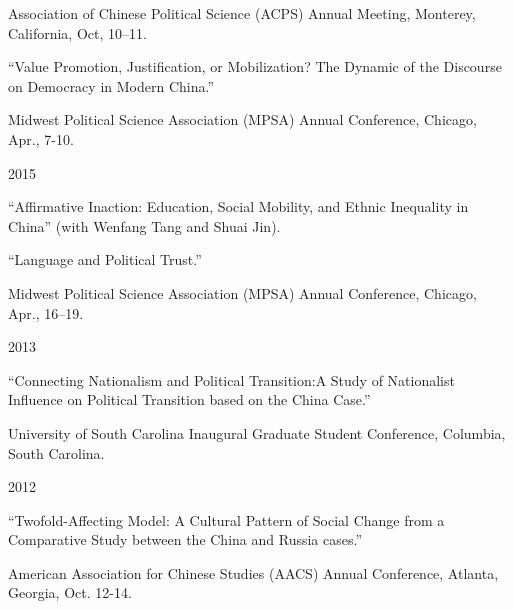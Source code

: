 \documentclass[10.5pt,]{article}
\providecommand{\tightlist}{%
  \setlength{\itemsep}{0pt}\setlength{\parskip}{0pt}}
\renewenvironment{itemize}{
  \begin{list}{}{
    \setlength{\leftmargin}{1.5em}
  }
}{
  \end{list}
}
\begin{document}
\begin{itemize}
\begin{itemize}
    \begin{itemize}
    \tightlist
    \item
      \footnotesize Association of Chinese Political Science (ACPS)
      Annual Meeting, Monterey, California, Oct, 10--11.
    \end{itemize}
  \item
    ``Value Promotion, Justification, or Mobilization? The Dynamic of
    the Discourse on Democracy in Modern China.''

    \begin{itemize}
    \tightlist
    \item
      \footnotesize Midwest Political Science Association (MPSA) Annual
      Conference, Chicago, Apr., 7-10.
    \end{itemize}
  \end{itemize}
\item
  2015

  \begin{itemize}
  \tightlist
  \item
    ``Affirmative Inaction: Education, Social Mobility, and Ethnic
    Inequality in China'' (with Wenfang Tang and Shuai Jin).
  \item
    ``Language and Political Trust.''

    \begin{itemize}
    \tightlist
    \item
      \footnotesize Midwest Political Science Association (MPSA) Annual
      Conference, Chicago, Apr., 16--19.
    \end{itemize}
  \end{itemize}
\item
  2013

  \begin{itemize}
  \tightlist
  \item
    ``Connecting Nationalism and Political Transition:A Study of
    Nationalist Influence on Political Transition based on the China
    Case.''

    \begin{itemize}
    \tightlist
    \item
      \footnotesize University of South Carolina Inaugural Graduate
      Student Conference, Columbia, South Carolina.
    \end{itemize}
  \end{itemize}
\item
  2012

  \begin{itemize}
  \tightlist
  \item
    ``Twofold-Affecting Model: A Cultural Pattern of Social Change from
    a Comparative Study between the China and Russia cases.''

    \begin{itemize}
    \tightlist
    \item
      \footnotesize American Association for Chinese Studies (AACS)
      Annual Conference, Atlanta, Georgia, Oct. 12-14.
    \end{itemize}
  \end{itemize}
\end{itemize}
\end{document}

